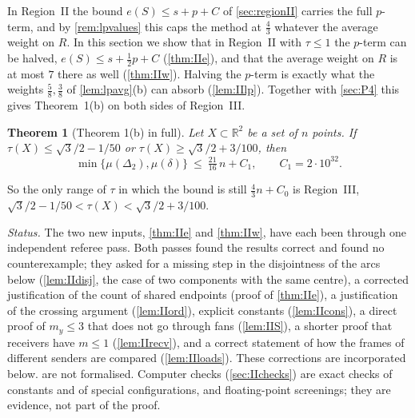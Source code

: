 \documentclass[11pt]{amsart}
\newtheorem{theorem}{Theorem}[section]
\theoremstyle{definition}
\theoremstyle{remark}
\newcommand{\R}{\mathbb{R}}
\newcommand{\Dt}{\Delta_2}
\newcommand{\mult}{\mu}
\begin{document}
In Region~II the bound $e(S)\le s+p+C$ of \cref{sec:regionII} carries the full $p$-term, and by \cref{rem:lpvalues} this caps the method at $\frac43$ whatever the average weight on $R$. In this section we show that in Region~II with $\tau\le1$ the $p$-term can be halved, $e(S)\le s+\frac12p+C$ (\cref{thm:IIe}), and that the average weight on $R$ is at most $7$ there as well (\cref{thm:IIw}). Halving the $p$-term is exactly what the weights $\frac58,\frac38$ of \cref{lem:lpavg}(b) can absorb (\cref{lem:IIlp}). Together with \cref{sec:P4} this gives Theorem~1(b) on both sides of Region~III.

\begin{theorem}[Theorem 1(b) in full]\label{thm:IIone}
Let $X\subset\R^2$ be a set of $n$ points. If $\tau(X)\le\sqrt3/2-1/50$ or $\tau(X)\ge\sqrt3/2+3/100$, then
\[
\min\{\mult(\Dt),\mult(\delta)\}\ \le\ \tfrac{21}{16}\,n+C_1,\qquad C_1=2\cdot10^{32}.
\]
\end{theorem}
So the only range of $\tau$ in which the bound is still $\frac43n+C_0$ is Region~III, $\sqrt3/2-1/50<\tau(X)<\sqrt3/2+3/100$.

\emph{Status.} The two new inputs, \cref{thm:IIe} and \cref{thm:IIw}, have each been through one independent referee pass. Both passes found the results correct and found no counterexample; they asked for a missing step in the disjointness of the arcs below (\cref{lem:IIdisj}, the case of two components with the same centre), a corrected justification of the count of shared endpoints (proof of \cref{thm:IIe}), a justification of the crossing argument (\cref{lem:IIord}), explicit constants (\cref{lem:IIcons}), a direct proof of $m_y\le3$ that does not go through fans (\cref{lem:IIS}), a shorter proof that receivers have $m\le1$ (\cref{lem:IIrecv}), and a correct statement of how the frames of different senders are compared (\cref{lem:IIloads}). These corrections are incorporated below.  are not formalised. Computer checks (\cref{sec:IIchecks}) are exact checks of constants and of special configurations, and floating-point screenings; they are evidence, not part of the proof.
\end{document}
